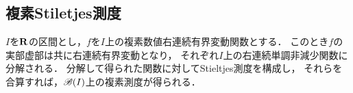 \subsection{複素Stiletjes測度}
	$I$を$\mathbf{R}$の区間とし，$f$を$I$上の複素数値右連続有界変動関数とする．
	このとき$f$の実部虚部は共に右連続有界変動となり，
	それぞれ$I$上の右連続単調非減少関数に分解される．
	分解して得られた関数に対してStieltjes測度を構成し，
	それらを合算すれば，$\mathscr{B}(I)$上の複素測度が得られる．